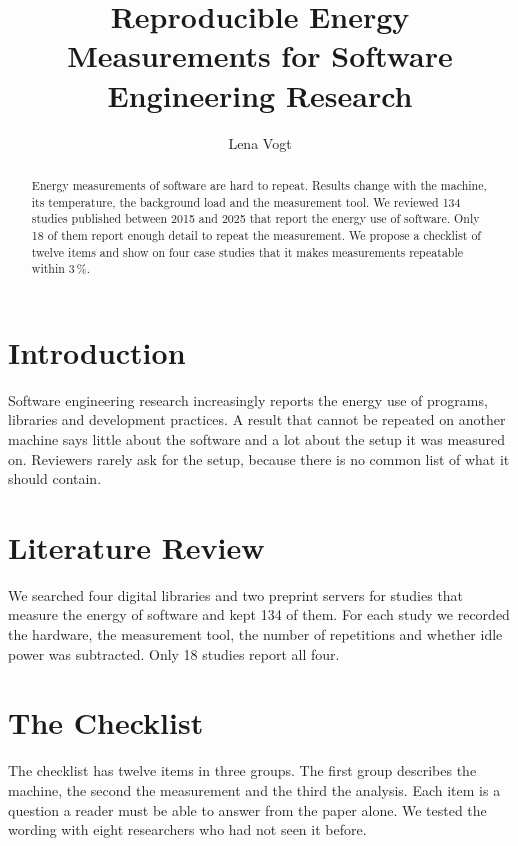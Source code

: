 \documentclass[acmsmall,review,anonymous]{acmart}
\begin{document}
\title{Reproducible Energy Measurements for Software Engineering Research}

\author{Lena Vogt}

\begin{abstract}
Energy measurements of software are hard to repeat. Results change with the
machine, its temperature, the background load and the measurement tool. We
reviewed 134 studies published between 2015 and 2025 that report the energy
use of software. Only 18 of them report enough detail to repeat the
measurement. We propose a checklist of twelve items and show on four case
studies that it makes measurements repeatable within 3\,\%.
\end{abstract}

\maketitle

\section{Introduction}

Software engineering research increasingly reports the energy use of
programs, libraries and development practices. A result that cannot be
repeated on another machine says little about the software and a lot about
the setup it was measured on. Reviewers rarely ask for the setup, because
there is no common list of what it should contain.

\section{Literature Review}

We searched four digital libraries and two preprint servers for studies that
measure the energy of software and kept 134 of them. For each study we
recorded the hardware, the measurement tool, the number of repetitions and
whether idle power was subtracted. Only 18 studies report all four.

\section{The Checklist}

The checklist has twelve items in three groups. The first group describes
the machine, the second the measurement and the third the analysis. Each item
is a question a reader must be able to answer from the paper alone. We
tested the wording with eight researchers who had not seen it before.
\end{document}
